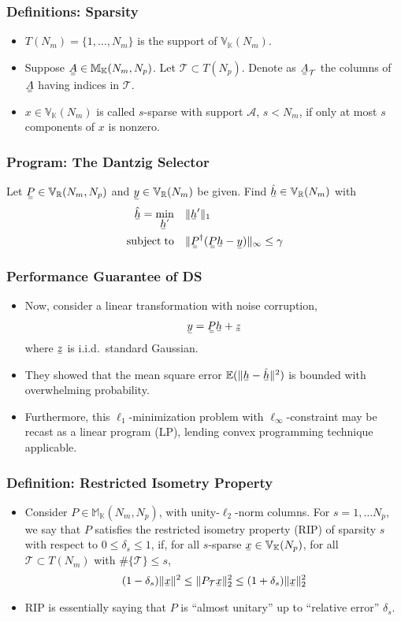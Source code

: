 \documentclass{beamer}
\newcommand{\Disp}[1]{\begin{align} #1 \end{align}}
\renewcommand{\H}{\dagger}
\newcommand{\NT}{\notag}
\renewcommand{\d}{\delta}
\newcommand{\I}{\item}
\newcommand{\MB}[1]{\mathbb{#1}}
\newcommand{\MC}[1]{\mathcal{#1}}
\newcommand{\RM}[1]{\mathrm{#1}}
\newcommand{\V}[1]{\stackunder[1.2pt]{$#1$}{\rule{.9ex}{.075ex}}}
\newcommand{\M}[1]{\V{\V{#1}}}
\begin{document}
\begin{frame}
\frametitle{Definitions: Sparsity}
\begin{itemize}
\I \(T (N_m) =\{1, \dotsc, N_m\}\) is the support of \(\MB{V}_{\MB{K}} (N_m)\).
\I Suppose \(\M{A} \in \MB{M}_{\MB{K}} (N_m, N_p)\).
Let \(\MC{T} \subset T (N_p)\).
Denote as \(\M{A}_{\MC{T}}\) the columns of \(\M{A}\) having indices in \(\MC{T}\).
\I \(x \in \MB{V}_{\MB{K}} (N_m)\) is called \(s\)-sparse with support \(\MC{A}\), \(s <N_m\), if only at most \(s\) components of \(x\) is nonzero.
\end{itemize}
\end{frame}

\begin{frame}
\frametitle{Program: The Dantzig Selector}
Let \(\M{P} \in \MB{V}_\MB{R} (N_m, N_p)\) and \(\V{y} \in \MB{V}_\MB{R} (N_m)\) be given.
Find \(\hat{\V{h}} \in \MB{V}_\MB{R} (N_m)\) with
\Disp{
\hat{\V{h}} =\min_{\V{h}'} \quad &\|\V{h}'\|_1 \\ \NT
\RM{subject}\; \RM{to} \quad &\|\M{P}^\H (\M{P} \V{h} -\V{y})\|_\infty \leq \gamma
}
\end{frame}

\begin{frame}
\frametitle{Performance Guarantee of DS}
\begin{itemize}
\I Now, consider a linear transformation with noise corruption,
\Disp{
\V{y} =\M{P} \V{h} + \V{z}
}
where \(\V{z}\) is i.i.d.\ standard Gaussian.

\I They showed that the mean square error \(\MB{E}(\| \V{h} -\hat{\V{h}} \|^2)\) is bounded with overwhelming probability.

\I Furthermore, this \(\ell_1\)-minimization problem with \(\ell_\infty\)-constraint may be recast as a linear program (LP), lending convex programming technique applicable.
\end{itemize}
\end{frame}

\begin{frame}
\frametitle{Definition: Restricted Isometry Property}
\begin{itemize}
\I Consider \(P \in \MB{M}_{\MB{K}} (N_m, N_p)\), with unity-\(\ell_2\)-norm columns.
For \(s =1, \dotsc N_p\), we say that \(P\) satisfies the restricted isometry property (RIP) of sparsity \(s\) with respect to \(0 \leq \d_s \leq 1\), if, for all \(s\)-sparse \(\V{x} \in \MB{V}_{\MB{K}} (N_p)\), for all \(\MC{T} \subset T(N_m)\) with \(\#\{\MC{T}\} \leq s\),
%
\Disp{
(1-\d_s) \|\V{x}\|^2
\leq \|P_{\MC{T}} \V{x}\|_2^2
\leq (1+\d_s) \|\V{x}\|_2^2
}
\I RIP is essentially saying that \(P\) is ``almost unitary'' up to ``relative error'' \(\d_s\).
\end{itemize}
\end{frame}
\end{document}
